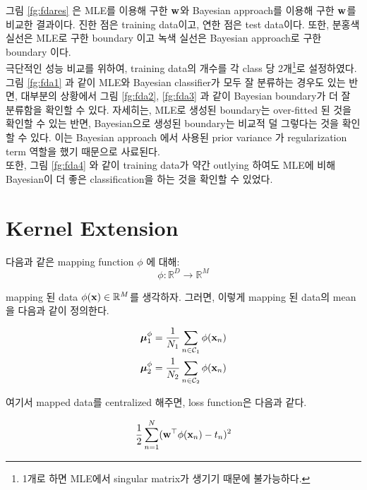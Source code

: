 \documentclass{article} %
\begin{document}
그림 \ref{fg:fdares} 은 MLE를 이용해 구한 $\bf w$와 Bayesian approach를 이용해 구한 $\bf w$를 비교한 결과이다. 진한 점은 training data이고, 연한 점은 test data이다. 또한, 분홍색 실선은 MLE로 구한 boundary 이고 녹색 실선은 Bayesian approach로 구한 boundary 이다.\\ 

극단적인 성능 비교를 위하여, training data의 개수를 각 class 당 2개\footnote{1개로 하면 MLE에서 singular matrix가 생기기 때문에 불가능하다.}로 설정하였다. 그림 \ref{fg:fda1} 과 같이 MLE와 Bayesian classifier가 모두 잘 분류하는 경우도 있는 반면, 대부분의 상황에서 그림 \ref{fg:fda2}, \ref{fg:fda3} 과 같이 Bayesian boundary가 더 잘 분류함을 확인할 수 있다. 자세히는, MLE로 생성된 boundary는 over-fitted 된 것을 확인할 수 있는 반면, Bayesian으로 생성된 boundary는 비교적 덜 그렇다는 것을 확인할 수 있다. 이는 Bayesian approach 에서 사용된 prior variance 가 regularization term 역할을 했기 때문으로 사료된다. \\ 

또한, 그림 \ref{fg:fda4} 와 같이 training data가 약간 outlying 하여도 MLE에 비해 Bayesian이 더 좋은 classification을 하는 것을 확인할 수 있었다.

\section{Kernel Extension}

다음과 같은 mapping function $\phi$ 에 대해:
\begin{equation}
	\phi: \mathbb{R}^D \to \mathbb{R}^M
\end{equation}

mapping 된 data $\phi({\bf x}) \in \mathbb{R}^M$를 생각하자. 그러면, 이렇게 mapping 된 data의 mean을 다음과 같이 정의한다.

\begin{equation}
\begin{aligned}
	\boldsymbol{\mu}_1^\phi &= \frac{1}{N_1} \sum_{n \in {\cal C}_1} \phi({\bf x}_n) \\
	\boldsymbol{\mu}_2^\phi &= \frac{1}{N_2} \sum_{n \in {\cal C}_2} \phi({\bf x}_n)
\end{aligned}
\end{equation}

여기서 mapped data를 centralized 해주면, loss function은 다음과 같다.

\begin{equation}
	\frac{1}{2} \sum_{n = 1}^N ({\bf w}^\top \phi({\bf x}_n) - t_n)^2
\end{equation} 
\end{document}
